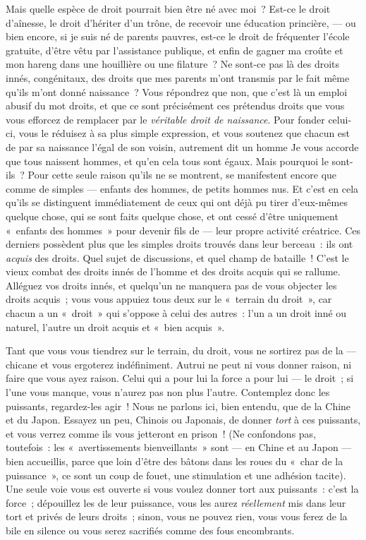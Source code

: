 \documentclass[french,twoside]{book} %
\begin{document}
\noindent Mais quelle espèce de droit pourrait bien être né avec moi ? Est-ce le droit d’aînesse, le droit d’hériter d’un trône, de recevoir une éducation princière, — ou bien encore, si je suis né de parents pauvres, est-ce le droit de fréquenter l’école gratuite, d’être vêtu  par l’assistance publique, et enfin de gagner ma croûte et mon hareng dans une houillière ou une filature ? Ne sont-ce pas là des droits innés, congénitaux, des droits que mes parents m’ont transmis par le fait même qu’ils m’ont donné naissance ? Vous répondrez que non, que c’est là un emploi abusif du mot droits, et que ce sont précisément ces prétendus droits que vous vous efforcez de remplacer par le \emph{véritable droit de naissance}. Pour fonder celui-ci, vous le réduisez à sa plus simple expression, et vous soutenez que chacun est de par sa naissance l’égal de son voisin, autrement dit un homme Je vous accorde que tous naissent hommes, et qu’en cela tous sont égaux. Mais pourquoi le sont-ils ? Pour cette seule raison qu’ils ne se montrent, se manifestent encore que comme de simples — enfants des hommes, de petits hommes nus. Et c’est en cela qu’ils se distinguent immédiatement de ceux qui ont déjà pu tirer d’eux-mêmes quelque chose, qui se sont faits quelque chose, et ont cessé d’être uniquement « enfants des hommes » pour devenir fils de — leur propre activité créatrice. Ces derniers possèdent plus que les simples droits trouvés dans leur berceau : ils ont \emph{acquis} des droits. Quel sujet de discussions, et quel champ de bataille ! C’est le vieux combat des droits innés de l’homme et des droits acquis qui se rallume. Alléguez vos droits innés, et quelqu’un ne manquera pas de vous objecter les droits acquis ; vous vous appuiez tous deux sur le « terrain du droit », car chacun a un « droit » qui s’oppose à celui des autres : l’un a un droit inné ou naturel, l’autre un droit acquis et « bien acquis ».\par
Tant que vous vous tiendrez sur le terrain, du droit, vous ne sortirez pas de la — chicane et vous ergoterez indéfiniment. Autrui ne peut ni vous donner raison, ni faire que vous ayez raison. Celui qui a pour lui la force a pour lui — le droit ; si l’une vous manque, vous n’aurez pas non plus l’autre. Contemplez  donc les puissants, regardez-les agir ! Nous ne parlons ici, bien entendu, que de la Chine et du Japon. Essayez un peu, Chinois ou Japonais, de donner \emph{tort} à ces puissants, et vous verrez comme ils vous jetteront en prison ! (Ne confondons pas, toutefois : les « avertissements bienveillants » sont — en Chine et au Japon — bien accueillis, parce que loin d’être des bâtons dans les roues du « char de la puissance », ce sont un coup de fouet, une stimulation et une adhésion tacite). Une seule voie vous est ouverte si vous voulez donner tort aux puissants : c’est la force ; dépouillez les de leur puissance, vous les aurez \emph{réellement }mis dans leur tort et privés de leurs droits ; sinon, vous ne pouvez rien, vous vous ferez de la bile en silence ou vous serez sacrifiés comme des fous encombrants.\par
\end{document}
